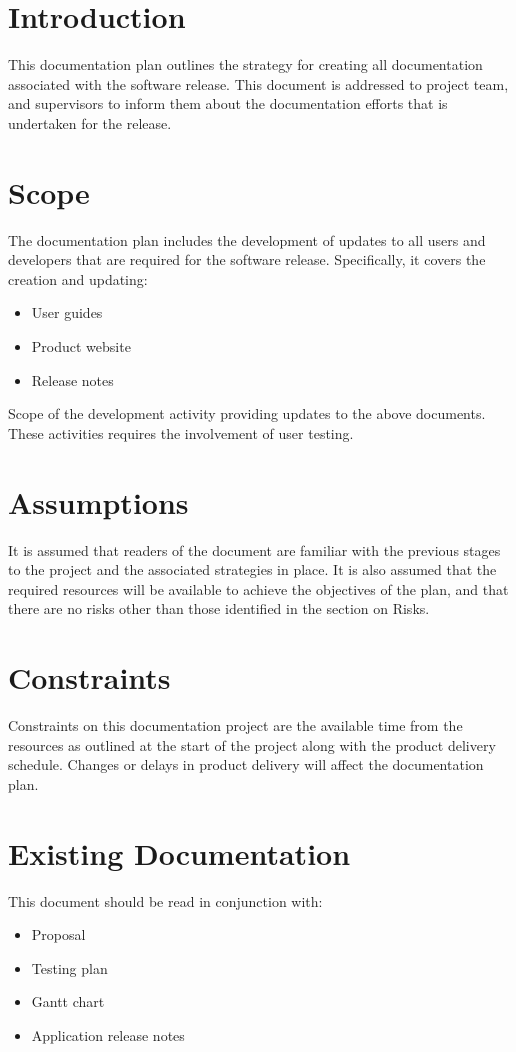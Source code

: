 \section*{Introduction}
This documentation plan outlines the strategy for creating all documentation associated with the software release. This document is addressed to project team, and supervisors to inform them about the documentation efforts that is undertaken for the release.

\section*{Scope}
The documentation plan includes the development of updates to all users and developers that are required for the software release. Specifically, it covers the creation and updating:
\begin{itemize}
	\item User guides
    \item Product website
	\item Release notes
\end{itemize}

Scope of the development activity providing updates to the above documents. These activities requires the involvement of user testing. 

\section*{Assumptions}
It is assumed that readers of the document are familiar with the previous stages to the project and the associated strategies in place. It is also assumed that the required resources will be available to achieve the objectives of the plan, and that there are no risks other than those identified in the section on Risks.

\section*{Constraints}
Constraints on this documentation project are the available time from the resources as outlined at the start of the project along with the product delivery schedule. Changes or delays in product delivery will affect the documentation plan.

\section*{Existing Documentation}
This document should be read in conjunction with:
\begin{itemize}
    \item Proposal
    \item Testing plan
    \item Gantt chart
    \item Application release notes
\end{itemize}

